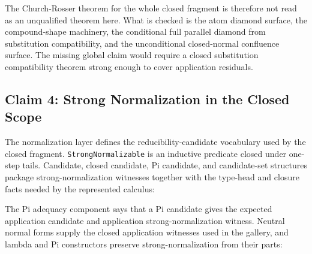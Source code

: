The Church-Rosser theorem for the whole closed fragment is therefore not read
as an unqualified theorem here.  What is checked is the atom diamond surface,
the compound-shape machinery, the conditional full parallel diamond from
substitution compatibility, and the unconditional closed-normal confluence
surface.  The missing global claim would require a closed substitution
compatibility theorem strong enough to cover application residuals.

\subsection{Claim 4: Strong Normalization in the Closed Scope}
\label{subsec:claim-strong-normalization-closed-scope}

The normalization layer defines the reducibility-candidate vocabulary used by
the closed fragment.  \texttt{StrongNormalizable} is an inductive predicate
closed under one-step tails.  Candidate, closed candidate, Pi candidate, and
candidate-set structures package strong-normalization witnesses together with
the type-head and closure facts needed by the represented calculus:


The Pi adequacy component says that a Pi candidate gives the expected
application candidate and application strong-normalization witness.  Neutral
normal forms supply the closed application witnesses used in the gallery, and
lambda and Pi constructors preserve strong-normalization from their parts:


